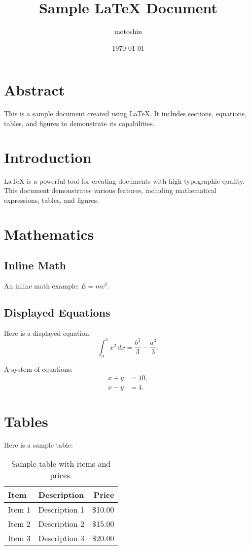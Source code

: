 \documentclass{article}
\title{Sample \LaTeX{} Document}
\author{motoshin}
\date{\today}
\begin{document}
\maketitle

\section*{Abstract}
This is a sample document created using \LaTeX{}. It includes sections, equations, tables, and figures to demonstrate its capabilities.

\section{Introduction}
\LaTeX{} is a powerful tool for creating documents with high typographic quality. This document demonstrates various features, including mathematical expressions, tables, and figures.

\section{Mathematics}
\subsection{Inline Math}
An inline math example: $E = mc^2$.

\subsection{Displayed Equations}
Here is a displayed equation:
\begin{equation}
\int_a^b x^2 \, dx = \frac{b^3}{3} - \frac{a^3}{3}.
\end{equation}

A system of equations:
\begin{align}
x + y &= 10, \\
x - y &= 4.
\end{align}

\section{Tables}
Here is a sample table:
\begin{table}[h!]
\centering
\begin{tabular}{llr}
\toprule
\textbf{Item} & \textbf{Description} & \textbf{Price} \\
\midrule
Item 1 & Description 1 & \$10.00 \\
Item 2 & Description 2 & \$15.00 \\
Item 3 & Description 3 & \$20.00 \\
\bottomrule
\end{tabular}
\caption{Sample table with items and prices.}
\label{tab:sample_table}
\end{table}
\end{document}
